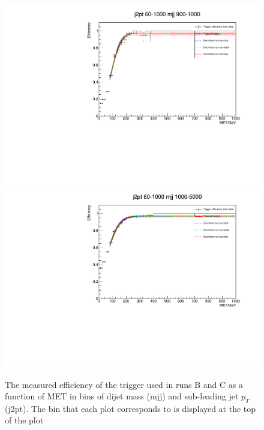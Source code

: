 \begin{figure}
\begin{center}
    \includegraphics[width=.6\largefigwidth]{plots/parked/trigfitplots/hData_MET_1D_44BC.pdf}
    \includegraphics[width=.6\largefigwidth]{plots/parked/trigfitplots/hData_MET_1D_45BC.pdf}
    \caption{The measured efficiency of the trigger used in runs B and C as a function of MET in bins of dijet mass (mjj) and sub-leading jet $p_{T}$ (j2pt). The bin that each plot corresponds to is displayed at the top of the plot}
    \label{fig:trigfitplotsBC2}
  \end{center}
\end{figure}


